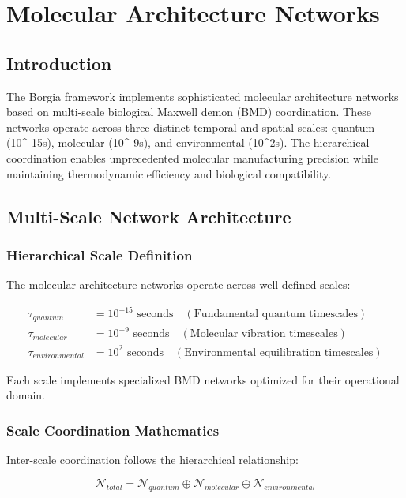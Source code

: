 \section{Molecular Architecture Networks}

\subsection{Introduction}

The Borgia framework implements sophisticated molecular architecture networks based on multi-scale biological Maxwell demon (BMD) coordination. These networks operate across three distinct temporal and spatial scales: quantum (10^{-15}s), molecular (10^{-9}s), and environmental (10^2s). The hierarchical coordination enables unprecedented molecular manufacturing precision while maintaining thermodynamic efficiency and biological compatibility.

\subsection{Multi-Scale Network Architecture}

\subsubsection{Hierarchical Scale Definition}

The molecular architecture networks operate across well-defined scales:

\begin{align}
\tau_{quantum} &= 10^{-15} \text{ seconds} \quad (\text{Fundamental quantum timescales}) \\
\tau_{molecular} &= 10^{-9} \text{ seconds} \quad (\text{Molecular vibration timescales}) \\
\tau_{environmental} &= 10^{2} \text{ seconds} \quad (\text{Environmental equilibration timescales})
\end{align}

Each scale implements specialized BMD networks optimized for their operational domain.

\subsubsection{Scale Coordination Mathematics}

Inter-scale coordination follows the hierarchical relationship:

\begin{equation}
\mathcal{N}_{total} = \mathcal{N}_{quantum} \oplus \mathcal{N}_{molecular} \oplus \mathcal{N}_{environmental}
\end{equation}

